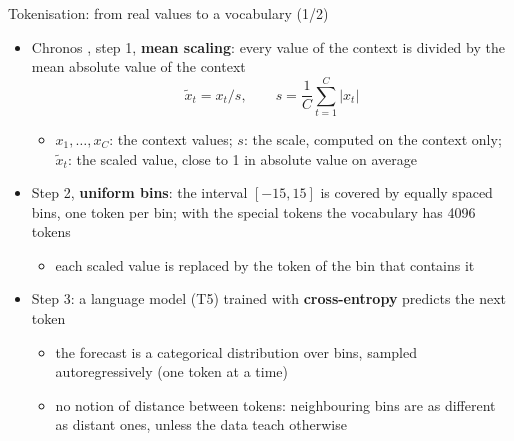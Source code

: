 \begin{frame}{Tokenisation: from real values to a vocabulary (1/2)}
\itemsize{\small}
\begin{itemize}
    \item Chronos , step 1, \textbf{mean scaling}: every value of the context is divided by the mean absolute value of the context \[ \tilde x_t = x_t / s, \qquad s = \frac1C\sum_{t = 1}^{C}|x_t| \]
    \begin{itemize}
        \item $x_1, \dots, x_C$: the context values; $s$: the scale, computed on the context only; $\tilde x_t$: the scaled value, close to 1 in absolute value on average
    \end{itemize}
    \item Step 2, \textbf{uniform bins}: the interval $[-15, 15]$ is covered by equally spaced bins, one token per bin; with the special tokens the vocabulary has 4096 tokens
    \begin{itemize}
        \item each scaled value is replaced by the token of the bin that contains it
    \end{itemize}
    \item Step 3: a language model (T5) trained with \textbf{cross-entropy} predicts the next token
    \begin{itemize}
        \item the forecast is a categorical distribution over bins, sampled autoregressively (one token at a time)
        \item no notion of distance between tokens: neighbouring bins are as different as distant ones, unless the data teach otherwise
    \end{itemize}
\end{itemize}
\end{frame}

